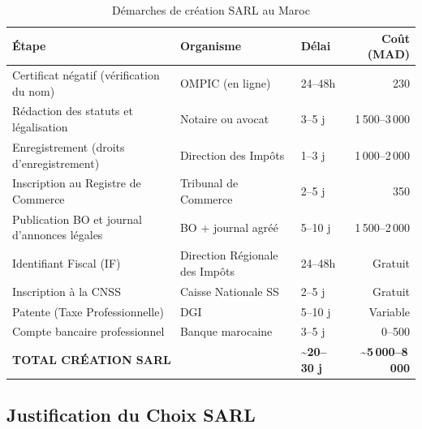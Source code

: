 \documentclass[12pt,a4paper,openany]{report}
\begin{document}
\begin{table}[H]
\centering
\small
\begin{tabularx}{\textwidth}{Xp{3.8cm}p{1.8cm}r}
\toprule
\textbf{Étape} & \textbf{Organisme} & \textbf{Délai} & \textbf{Coût (MAD)} \\
\midrule
Certificat négatif (vérification du nom)       & OMPIC (en ligne)               & 24–48h  & 230 \\
Rédaction des statuts et légalisation          & Notaire ou avocat              & 3–5 j   & 1\,500–3\,000 \\
Enregistrement (droits d'enregistrement)       & Direction des Impôts           & 1–3 j   & 1\,000–2\,000 \\
Inscription au Registre de Commerce            & Tribunal de Commerce           & 2–5 j   & 350 \\
Publication BO et journal d'annonces légales   & BO + journal agréé             & 5–10 j  & 1\,500–2\,000 \\
Identifiant Fiscal (IF)                        & Direction Régionale des Impôts & 24–48h  & Gratuit \\
Inscription à la CNSS                          & Caisse Nationale SS            & 2–5 j   & Gratuit \\
Patente (Taxe Professionnelle)                 & DGI                            & 5–10 j  & Variable \\
Compte bancaire professionnel                  & Banque marocaine               & 3–5 j   & 0–500 \\
\midrule
\multicolumn{2}{l}{\textbf{TOTAL CRÉATION SARL}} & \textbf{\textasciitilde{}20–30 j} & \textbf{\textasciitilde{}5\,000–8\,000} \\
\bottomrule
\end{tabularx}
\caption{Démarches de création SARL au Maroc}
\label{tab:sarl_creation}
\end{table}

\subsection{Justification du Choix SARL}
\end{document}
